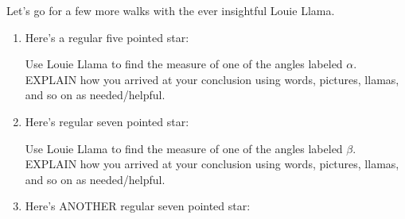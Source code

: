 \documentclass[nooutcomes,noauthor,hints,handout]{ximera}
\begin{document}
\mynewpage

\begin{question}
  Let's go for a few more walks with the ever insightful Louie Llama.
  \begin{enumerate}
  \item Here's a regular five pointed star:
    \begin{center}
    \end{center}
    Use Louie Llama to find the measure of one of the angles labeled
    $\alpha$. EXPLAIN how you arrived at your conclusion using words,
    pictures, llamas, and so on as needed/helpful.
  \item Here's regular seven pointed star:
    \begin{center}
    \end{center}
    Use Louie Llama to find the measure of one of the angles labeled
    $\beta$. EXPLAIN how you arrived at your conclusion using words,
    pictures, llamas, and so on as needed/helpful.  
  \item Here's ANOTHER regular seven pointed star:
    \begin{center}
\end{center}
\end{enumerate}
\end{question}
\end{document}
